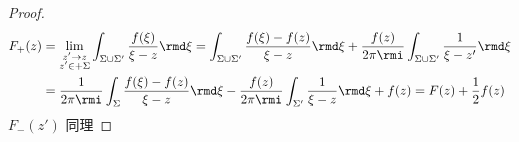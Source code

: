 \begin{proof}
\begin{equation}
\begin{aligned}
            F_{+}(z) & = \lim_{\substack{z' \to z                                                                                                                                                      \\ z' \in +\Sigma}} \int_{\Sigma \cup \Sigma'}  \frac{f(\xi)}{\xi - z}  \rmd \xi = \int_{\Sigma \cup \Sigma'}  \frac{f(\xi) - f(z)}{\xi - z}  \rmd \xi + \frac{f(z)}{2 \pi \rmi} \int_{\Sigma \cup \Sigma'} \frac{1}{\xi - z'} \rmd \xi \\
                     & = \frac{1}{2 \pi \rmi} \int_{\Sigma} \frac{f(\xi) - f(z)}{\xi - z} \rmd \xi - \frac{f(z)}{2 \pi \rmi} \int_{\Sigma'} \frac{1}{\xi - z} \rmd \xi + f(z) = F(z) + \frac{1}{2}f(z)
        \end{aligned}
    \end{equation}
    $ F_{-}(z') $ 同理
\end{proof}

